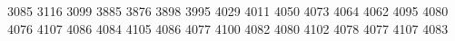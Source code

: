 3085
3116
3099
3885
3876
3898
3995
4029
4011
4050
4073
4064
4062
4095
4080
4076
4107
4086
4084
4105
4086
4077
4100
4082
4080
4102
4078
4077
4107
4083
